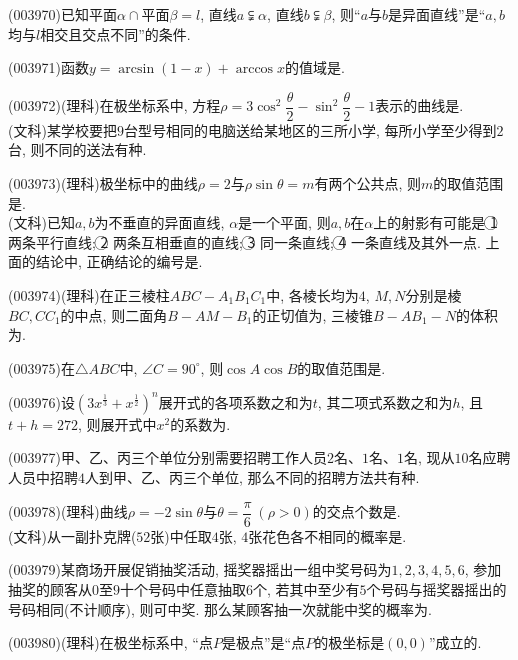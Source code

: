 \item (003970)已知平面$\alpha\cap$平面$\beta=l$, 直线$a\subsetneqq\alpha$, 直线$b\subsetneqq \beta$, 则``$a$与$b$是异面直线''是``$a,b$均与$l$相交且交点不同''的条件.
\item (003971)函数$y=\arcsin(1-x)+\arccos x$的值域是.
\item (003972)(理科)在极坐标系中, 方程$\rho=3\cos^2\dfrac{\theta}{2}-\sin^2\dfrac{\theta}{2}-1$表示的曲线是.\\
(文科)某学校要把$9$台型号相同的电脑送给某地区的三所小学, 每所小学至少得到$2$台, 则不同的送法有种.
\item (003973)(理科)极坐标中的曲线$\rho=2$与$\rho\sin\theta=m$有两个公共点, 则$m$的取值范围是.\\
(文科)已知$a,b$为不垂直的异面直线, $\alpha$是一个平面, 则$a,b$在$\alpha$上的射影有可能是
\textcircled{1} 两条平行直线; \textcircled{2} 两条互相垂直的直线; \textcircled{3} 同一条直线; \textcircled{4} 一条直线及其外一点.
上面的结论中, 正确结论的编号是.
\item (003974)(理科)在正三棱柱$ABC-A_1B_1C_1$中, 各棱长均为$4$, $M,N$分别是棱$BC,CC_1$的中点, 则二面角$B-AM-B_1$的正切值为, 三棱锥$B-AB_1-N$的体积为.
\item (003975)在$\triangle ABC$中, $\angle C=90^\circ$, 则$\cos A\cos B$的取值范围是.
\item (003976)设$\left(3x^{\frac 13}+x^\frac 12\right)^n$展开式的各项系数之和为$t$, 其二项式系数之和为$h$, 且$t+h=272$, 则展开式中$x^2$的系数为.
\item (003977)甲、乙、丙三个单位分别需要招聘工作人员$2$名、$1$名、$1$名, 现从$10$名应聘人员中招聘$4$人到甲、乙、丙三个单位, 那么不同的招聘方法共有种.
\item (003978)(理科)曲线$\rho=-2\sin\theta$与$\theta=\dfrac{\pi}{6} \ (\rho>0)$的交点个数是.\\
(文科)从一副扑克牌($52$张)中任取$4$张, $4$张花色各不相同的概率是.
\item (003979)某商场开展促销抽奖活动, 摇奖器摇出一组中奖号码为$1,2,3,4,5,6$, 参加抽奖的顾客从$0$至$9$十个号码中任意抽取$6$个, 若其中至少有$5$个号码与摇奖器摇出的号码相同(不计顺序), 则可中奖. 那么某顾客抽一次就能中奖的概率为.
\item (003980)(理科)在极坐标系中, ``点$P$是极点''是``点$P$的极坐标是$(0,0)$''成立的.
\\
